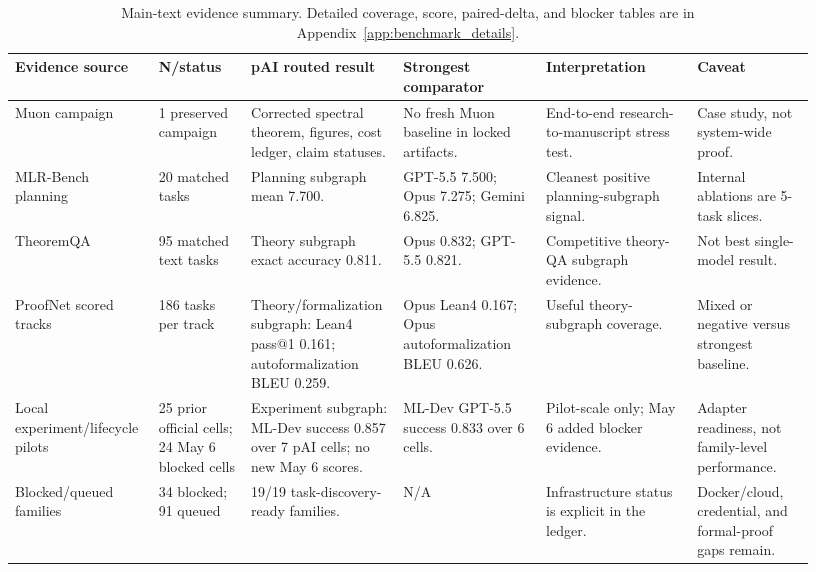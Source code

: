 \documentclass{article}
\begin{document}
\begin{table}[t]
\centering
\caption{Main-text evidence summary. Detailed coverage, score, paired-delta, and blocker tables are in Appendix~\ref{app:benchmark_details}.}
\label{tab:evidence_summary}
\scriptsize
\setlength{\tabcolsep}{2pt}
\begin{tabular}{@{}p{0.16\linewidth}p{0.11\linewidth}p{0.17\linewidth}p{0.17\linewidth}p{0.18\linewidth}p{0.14\linewidth}@{}}
\toprule
\textbf{Evidence source} & \textbf{N/status} & \textbf{pAI routed result} & \textbf{Strongest comparator} & \textbf{Interpretation} & \textbf{Caveat} \\
\midrule
Muon campaign & 1 preserved campaign & Corrected spectral theorem, figures, cost ledger, claim statuses. & No fresh Muon baseline in locked artifacts. & End-to-end research-to-manuscript stress test. & Case study, not system-wide proof. \\
MLR-Bench planning & 20 matched tasks & Planning subgraph mean 7.700. & GPT-5.5 7.500; Opus 7.275; Gemini 6.825. & Cleanest positive planning-subgraph signal. & Internal ablations are 5-task slices. \\
TheoremQA & 95 matched text tasks & Theory subgraph exact accuracy 0.811. & Opus 0.832; GPT-5.5 0.821. & Competitive theory-QA subgraph evidence. & Not best single-model result. \\
ProofNet scored tracks & 186 tasks per track & Theory/formalization subgraph: Lean4 pass@1 0.161; autoformalization BLEU 0.259. & Opus Lean4 0.167; Opus autoformalization BLEU 0.626. & Useful theory-subgraph coverage. & Mixed or negative versus strongest baseline. \\
Local experiment/lifecycle pilots & 25 prior official cells; 24 May 6 blocked cells & Experiment subgraph: ML-Dev success 0.857 over 7 pAI cells; no new May 6 scores. & ML-Dev GPT-5.5 success 0.833 over 6 cells. & Pilot-scale only; May 6 added blocker evidence. & Adapter readiness, not family-level performance. \\
Blocked/queued families & 34 blocked; 91 queued & 19/19 task-discovery-ready families. & N/A & Infrastructure status is explicit in the ledger. & Docker/cloud, credential, and formal-proof gaps remain. \\
\bottomrule
\end{tabular}
\end{table}
\end{document}
